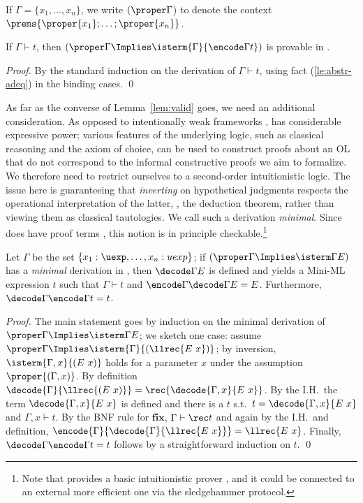 \documentclass[final]{svjour3}
\begin{document}
 If $\Gamma=\{x_1,\ldots, x_n\}$, we write $(\proper \Gamma$) to denote
 the \HOL context $\prems{\proper{x_1};\ldots;\proper{x_n}}$.
\begin{lem}
\label{le:exp-sound}
  If $\Gamma\vdash t$, then
  $(\proper\Gamma\Implies\isterm{\Gamma}{\encode \Gamma  t})$ is provable in
    \HOL.
\label{lem:valid}
\end{lem}
\begin{proof}
  By the standard induction on the derivation of $\Gamma\vdash t$,
  using fact (\ref{le:abstr-adeq}) in the binding cases.
\qed
\end{proof}
As far as the converse of Lemma~\ref{lem:valid} goes, we need an
additional consideration.  As opposed to intentionally weak frameworks
\cite{DeBruijn91lf}, \HOL has considerable expressive power; various
features of the underlying logic, such as classical reasoning and the
axiom of choice, can be used to construct proofs about an OL that do
not correspond to the informal constructive proofs we aim to
formalize.
We therefore need to  restrict ourselves to a second-order
intuitionistic logic. The issue
here is guaranteeing that \emph{inverting} on hypothetical judgments
respects the operational interpretation of the latter, \ie, the
deduction theorem, rather than viewing them as classical
tautologies. We call such a derivation \emph{minimal}. Since \HOL does
have  proof terms \cite{BerghoferN-TPHOLs00}, this notion is in
principle checkable.\footnote{Note that \HOL provides a basic
  intuitionistic prover , and it could be connected to an
  external more efficient one via the sledgehammer protocol. }




\begin{lem}
\label{le:complete}
Let $\Gamma$ be the set $ \{x_1: \uexp,\dots,x_n:uexp\}$; if
$(\proper\Gamma\Implies\isterm\Gamma E)$ has a \emph{minimal} derivation
in \HOL, then $\decode\Gamma E$ is defined and yields a Mini-ML
expression $t$ such that $\Gamma\vdash t$ and $\encode\Gamma{\decode
  \Gamma E} = E$. Furthermore, $\decode\Gamma{\encode \Gamma t} = t$.
\end{lem}
\begin{proof}
  The main statement goes by induction on the minimal derivation of
  $\proper\Gamma\Implies\isterm\Gamma E$; we sketch one case: assume
  $\proper\Gamma\Implies\isterm{\Gamma}{(\llrec{E\ x})}$; by
  inversion, $\isterm{\Gamma,x}{(E~x)}$ holds for a parameter $x$
  under the assumption $\proper {(\Gamma, x)}$. By definition
  $\decode{\Gamma} {\llrec{(E\ x)}} = \rec{\decode{\Gamma,x} {E\ x}}$.
  By the I.H.\, the term $\decode{\Gamma,x} {E\ x}$ is defined and
  there is a $t$ s.t.\ $t=\decode{\Gamma,x} {E\ x}$ and
  $\Gamma,x\vdash t$.  By the BNF rule for $\mathbf{fix}$, $\Gamma
  \vdash \rec t$ and again by the I.H.\ and definition,
  $\encode{\Gamma}{\decode{\Gamma} {\llrec{E\ x}}}={\llrec{E\ x}}$.
  Finally, $\decode\Gamma{\encode \Gamma t} = t$ follows by a
  straightforward induction on $t$. \qed\end{proof}
\end{document}
